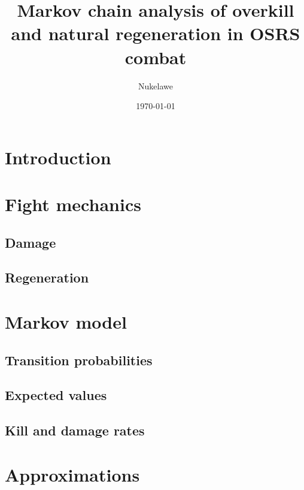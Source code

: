 

\title{Markov chain analysis of overkill and natural regeneration in OSRS combat}
\author{Nukelawe}
\date{\today}
\maketitle

\tableofcontents
\pagebreak

\section{Introduction}\label{chap:introduction}

\pagebreak

\section{Fight mechanics}\label{chap:mechanics}
	\subsection{Damage}\label{chap:fightMechanics}
	
	\subsection{Regeneration}\label{chap:regenMechanics}
	
\pagebreak

\section{Markov model}\label{chap:markovModel}
	
	\subsection{Transition probabilities}\label{chap:transitionProbabilities}
	
	\subsection{Expected values}\label{chap:expectations}
	
	\subsection{Kill and damage rates}\label{chap:rates}
	
\pagebreak

\section{Approximations}\label{chap:appr}
	

